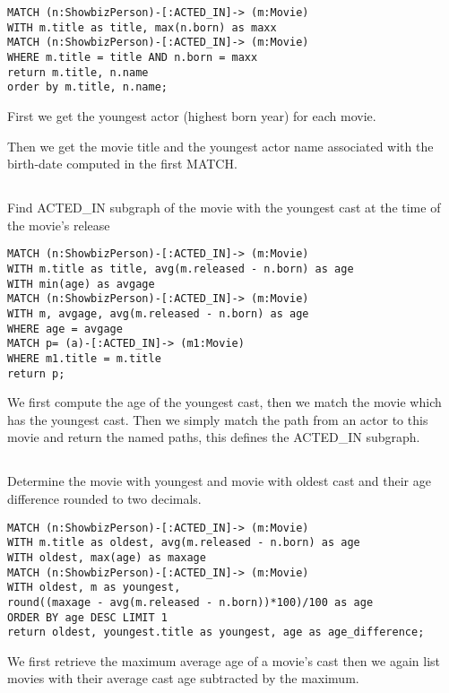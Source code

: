 \begin{verbatim}
MATCH (n:ShowbizPerson)-[:ACTED_IN]-> (m:Movie)
WITH m.title as title, max(n.born) as maxx
MATCH (n:ShowbizPerson)-[:ACTED_IN]-> (m:Movie)
WHERE m.title = title AND n.born = maxx
return m.title, n.name
order by m.title, n.name;
\end{verbatim}

First we get the youngest actor (highest born year) for each movie.

Then we get the movie title and the youngest actor name associated with the birth-date computed in the first MATCH.

\subsection{}
Find ACTED\_IN subgraph of the movie with the youngest cast at the time of the movie’s release

\begin{verbatim}
MATCH (n:ShowbizPerson)-[:ACTED_IN]-> (m:Movie)
WITH m.title as title, avg(m.released - n.born) as age
WITH min(age) as avgage
MATCH (n:ShowbizPerson)-[:ACTED_IN]-> (m:Movie)
WITH m, avgage, avg(m.released - n.born) as age
WHERE age = avgage
MATCH p= (a)-[:ACTED_IN]-> (m1:Movie)
WHERE m1.title = m.title
return p;
\end{verbatim}

We first compute the age of the youngest cast, then we match the movie which has the youngest cast. Then we simply match the path from an actor to this movie and return the named paths, this defines the ACTED\_IN subgraph.

\subsection{}
Determine the movie with youngest and movie with oldest cast and their age difference rounded to two decimals.

\begin{verbatim}
MATCH (n:ShowbizPerson)-[:ACTED_IN]-> (m:Movie)
WITH m.title as oldest, avg(m.released - n.born) as age
WITH oldest, max(age) as maxage
MATCH (n:ShowbizPerson)-[:ACTED_IN]-> (m:Movie)
WITH oldest, m as youngest,
round((maxage - avg(m.released - n.born))*100)/100 as age
ORDER BY age DESC LIMIT 1
return oldest, youngest.title as youngest, age as age_difference;
\end{verbatim}

We first retrieve the maximum average age of a movie's cast then we again list movies with their average cast age subtracted by the maximum.

